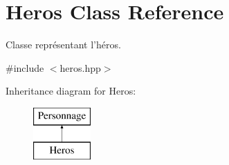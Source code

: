 \hypertarget{class_heros}{\section{Heros Class Reference}
\label{class_heros}
}


Classe représentant l'héros.  




{\ttfamily \#include $<$heros.\-hpp$>$}

Inheritance diagram for Heros\-:\begin{figure}[H]
\begin{center}
\leavevmode
\includegraphics[height=2.000000cm]{class_heros}
\end{center}
\end{figure}
